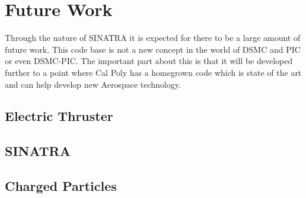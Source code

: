 \section{Future Work}

Through the nature of SINATRA it is expected for there to be a large amount of future work. This code base is not a new concept in the world of DSMC and PIC or even DSMC-PIC. The important part about this is that it will be developed further to a point where Cal Poly has a homegrown code which is state of the art and can help develop new Aerospace technology. 

\subsection{Electric Thruster}
\subsection{SINATRA}
\subsection{Charged Particles}